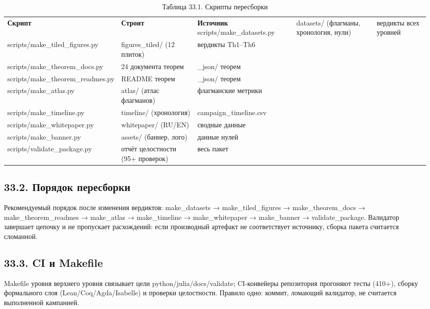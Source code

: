 \documentclass[11pt,a4paper]{article}
\begin{document}
\begin{table}[htbp]\centering\small
\caption{Таблица 33.1. Скрипты пересборки}
\begin{tabular}{p{} p{} p{}}
\toprule
\textbf{Скрипт} & \textbf{Строит} & \textbf{Источник}
\midrule
scripts/make\_datasets.py & datasets/ (флагманы, хронология, нули) & вердикты всех уровней \\
scripts/make\_tiled\_figures.py & figures\_tiled/ (12 плиток) & вердикты Th1–Th6 \\
scripts/make\_theorem\_docs.py & 24 документа теорем & \_json/ теорем \\
scripts/make\_theorem\_readmes.py & README теорем & \_json/ теорем \\
scripts/make\_atlas.py & atlas/ (атлас флагманов) & флагманские метрики \\
scripts/make\_timeline.py & timeline/ (хронология) & campaign\_timeline.csv \\
scripts/make\_whitepaper.py & whitepaper/ (RU/EN) & сводные данные \\
scripts/make\_banner.py & assets/ (баннер, лого) & данные нулей \\
scripts/validate\_package.py & отчёт целостности (95+ проверок) & весь пакет \\
\bottomrule
\end{tabular}
\end{table}

\subsection{33.2. Порядок пересборки}

Рекомендуемый порядок после изменения вердиктов: make\_datasets → make\_tiled\_figures → make\_theorem\_docs → make\_theorem\_readmes → make\_atlas → make\_timeline → make\_whitepaper → make\_banner → validate\_package. Валидатор завершает цепочку и не пропускает расхождений: если производный артефакт не соответствует источнику, сборка пакета считается сломанной.

\subsection{33.3. CI и Makefile}

Makefile уровня верхнего уровня связывает цели python/julia/docs/validate; CI-конвейеры репозитория прогоняют тесты (410+), сборку формального слоя (Lean/Coq/Agda/Isabelle) и проверки целостности. Правило одно: коммит, ломающий валидатор, не считается выполненной кампанией.
\end{document}
